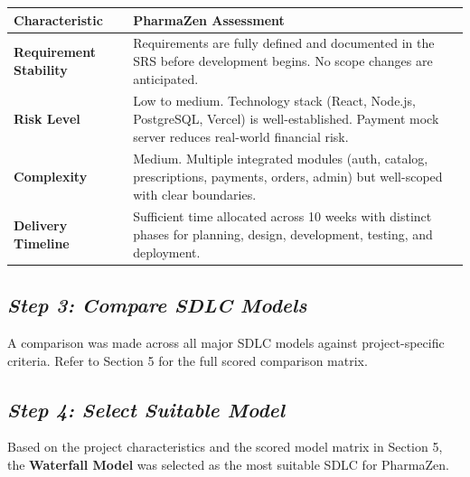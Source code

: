 \documentclass[12pt, a4paper]{article}
\begin{document}
\vspace{6pt}
\renewcommand{\arraystretch}{1.5}
\begin{tabular}{|L{4.5cm}|L{10.5cm}|}
  \hline
  \textbf{\color{white}Characteristic} & \textbf{\color{white}PharmaZen Assessment} \\
  \hline
  \textbf{Requirement Stability} & Requirements are fully defined and documented in the SRS before development begins. No scope changes are anticipated. \\
  \hline
  \textbf{Risk Level} & Low to medium. Technology stack (React, Node.js, PostgreSQL, Vercel) is well-established. Payment mock server reduces real-world financial risk. \\
  \hline
  \textbf{Complexity} & Medium. Multiple integrated modules (auth, catalog, prescriptions, payments, orders, admin) but well-scoped with clear boundaries. \\
  \hline
  \textbf{Delivery Timeline} & Sufficient time allocated across 10 weeks with distinct phases for planning, design, development, testing, and deployment. \\
  \hline
\end{tabular}

\subsection*{\textit{Step 3: Compare SDLC Models}}

A comparison was made across all major SDLC models against project-specific criteria. Refer to Section 5 for the full scored comparison matrix.

\subsection*{\textit{Step 4: Select Suitable Model}}

Based on the project characteristics and the scored model matrix in Section 5, the \textbf{Waterfall Model} was selected as the most suitable SDLC for PharmaZen.

\end{document}
